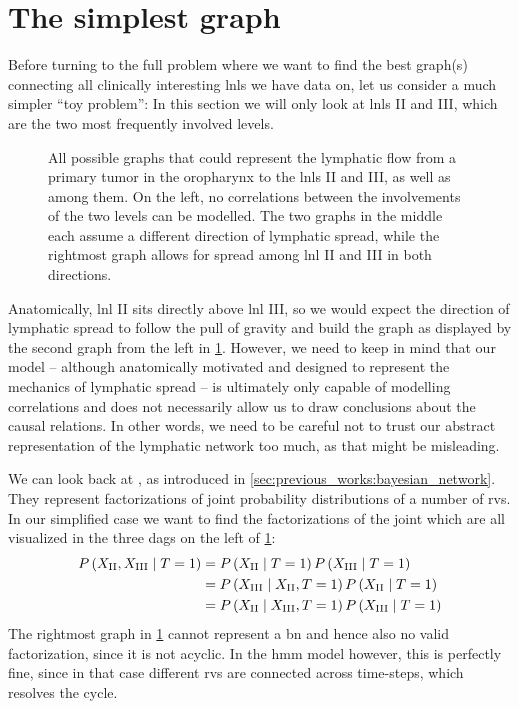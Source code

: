 \documentclass[\relativeRoot/main.tex]{subfiles}
\begin{document}
\section{The simplest graph}
\label{sec:graph:simple}

Before turning to the full problem where we want to find the best graph(s) connecting all clinically interesting \glspl{lnl} we have data on, let us consider a much simpler ``toy problem'': In this section we will only look at \glspl{lnl} II and III, which are the two most frequently involved levels.

\begin{figure}
    \centering
    \def\svgwidth{1.0\textwidth}
    
    \caption{All possible graphs that could represent the lymphatic flow from a primary tumor in the oropharynx to the \glspl{lnl} II and III, as well as among them. On the left, no correlations between the involvements of the two levels can be modelled. The two graphs in the middle each assume a different direction of lymphatic spread, while the rightmost graph allows for spread among \gls{lnl} II and III in both directions.}
    \label{fig:graph:simple}
\end{figure}

Anatomically, \gls{lnl} II sits directly above \gls{lnl} III, so we would expect the direction of lymphatic spread to follow the pull of gravity and build the graph as displayed by the second graph from the left in \cref{fig:graph:simple}. However, we need to keep in mind that our model -- although anatomically motivated and designed to represent the mechanics of lymphatic spread -- is ultimately only capable of modelling correlations and does not necessarily allow us to draw conclusions about the causal relations. In other words, we need to be careful not to trust our abstract representation of the lymphatic network too much, as that might be misleading.

We can look back at , as introduced in \cref{sec:previous_works:bayesian_network}. They represent factorizations of joint probability distributions of a number of \glspl{rv}. In our simplified case we want to find the factorizations of the joint which are all visualized in the three \glspl{dag} on the left of \cref{fig:graph:simple}:
%
\begin{equation}
    \begin{aligned}
        P \left( X_\text{II}, X_\text{III} \mid T=1 \right) &= P \left( X_\text{II} \mid T=1 \right) P \left( X_\text{III} \mid T=1 \right) \\
        &= P \left( X_\text{III} \mid X_\text{II}, T=1 \right) P \left( X_\text{II} \mid T=1 \right) \\
        &= P \left( X_\text{II} \mid X_\text{III}, T=1 \right) P \left( X_\text{III} \mid T=1 \right)
    \end{aligned}
\end{equation}
%
The rightmost graph in \cref{fig:graph:simple} cannot represent a \gls{bn} and hence also no valid factorization, since it is not acyclic. In the \gls{hmm} model however, this is perfectly fine, since in that case different \glspl{rv} are connected across time-steps, which resolves the cycle.
\end{document}

